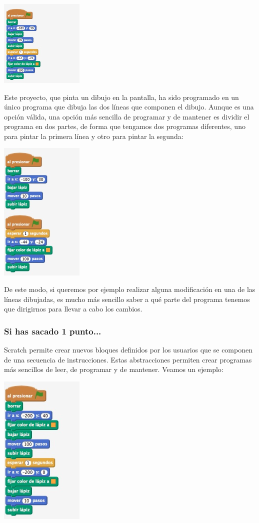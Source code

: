 \documentclass[a4paper,10pt]{article}
\begin{document}
\includegraphics[width=4cm]{img/abs1.jpg}

Este proyecto, que pinta un dibujo en la pantalla, ha sido programado en un único programa que dibuja las dos líneas que componen el dibujo. Aunque es una opción válida, una opción más sencilla de programar y de mantener es dividir el programa en dos partes, de forma que tengamos dos programas diferentes, uno para pintar la primera línea y otro para pintar la segunda:


\includegraphics[width=4cm]{img/abs2.jpg}



De este modo, si queremos por ejemplo realizar alguna modificación en una de las líneas dibujadas, es mucho más sencillo saber a qué parte del programa tenemos que dirigirnos para llevar a cabo los cambios.
\subsubsection{Si has sacado 1 punto...}
Scratch permite crear nuevos bloques definidos por los usuarios que se componen de una secuencia de instrucciones. Estas abstracciones permiten crear programas más sencillos de leer, de programar y de mantener. Veamos un ejemplo: 


\includegraphics[width=4cm]{img/abs3.jpg}
\end{document}
